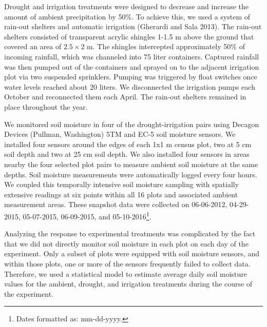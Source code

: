 \documentclass[fleqn,10pt,lineno]{wlpeerj} %
\begin{document}
Drought and irrigation treatments were designed to decrease and increase
the amount of ambient precipitation by 50\%. To achieve this, we used a
system of rain-out shelters and automatic irrigation (Gherardi and Sala
2013). The rain-out shelters consisted of transparent acrylic shingles
1-1.5 m above the ground that covered an area of \(2.5\times2\) m. The
shingles intercepted approximately 50\% of incoming rainfall, which was
channeled into 75 liter containers. Captured rainfall was then pumped
out of the containers and sprayed on to the adjacent irrigation plot via
two suspended sprinklers. Pumping was triggered by float switches once
water levels reached about 20 liters. We disconnected the irrigation
pumps each October and reconnected them each April. The rain-out
shelters remained in place throughout the year.

We monitored soil moisture in four of the drought-irrigation pairs using
Decagon Devices (Pullman, Washington) 5TM and EC-5 soil moisture
sensors. We installed four sensors around the edges of each 1x1 m census
plot, two at 5 cm soil depth and two at 25 cm soil depth. We also
installed four sensors in areas nearby the four selected plot pairs to
measure ambient soil moisture at the same depths. Soil moisture
measurements were automatically logged every four hours. We coupled this
temporally intensive soil moisture sampling with spatially extensive
readings  at six points within
all 16 plots and associated ambient measurement areas. These snapshot
data were collected on 06-06-2012, 04-29-2015, 05-07-2015, 06-09-2015,
and 05-10-2016\footnote{Dates formatted as: mm-dd-yyyy.}.

Analyzing the response to experimental treatments was complicated by the
fact that we did not directly monitor soil moisture in each plot on each
day of the experiment. Only a subset of plots were equipped with soil
moisture sensors, and within those plots, one or more of the sensors
frequently failed to collect data. Therefore, we used a statistical
model to estimate average daily soil moisture values for the ambient,
drought, and irrigation treatments during the course of the experiment.
\end{document}
